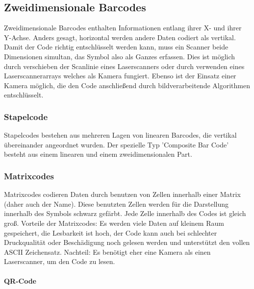 \subsection{Zweidimensionale Barcodes}
Zweidimensionale Barcodes enthalten Informationen entlang ihrer X- und ihrer Y-Achse. Anders gesagt, horizontal werden andere Daten codiert als vertikal.
Damit der Code richtig entschlüsselt werden kann, muss ein Scanner beide Dimensionen simultan, das Symbol also als Ganzes erfassen. Dies ist möglich durch verschieben der Scanlinie eines Laserscanners oder durch verwenden eines Laserscannerarrays welches als Kamera fungiert. Ebenso ist der Einsatz einer Kamera möglich, die den Code anschließend durch bildverarbeitende Algorithmen entschlüsselt.

\subsubsection{Stapelcode}
Stapelcodes bestehen aus mehreren Lagen von linearen Barcodes, die vertikal übereinander angeordnet wurden.
Der spezielle Typ 'Composite Bar Code' besteht aus einem linearen und einem zweidimensionalen Part.

\subsubsection{Matrixcodes}
Matrixcodes codieren Daten durch benutzen von Zellen innerhalb einer Matrix (daher auch der Name). Diese benutzten Zellen werden für die Darstellung innerhalb des Symbols schwarz gefärbt. Jede Zelle innerhalb des Codes ist gleich groß. 
Vorteile der Matrixcodes: Es werden viele Daten auf kleinem Raum gespeichert, die Lesbarkeit ist hoch, der Code kann auch bei schlechter Druckqualität oder Beschädigung noch gelesen werden und unterstützt den vollen ASCII Zeichensatz.
Nachteil: Es benötigt eher eine Kamera als einen Laserscanner, um den Code zu lesen. 
\samepage
\paragraph{QR-Code}~

